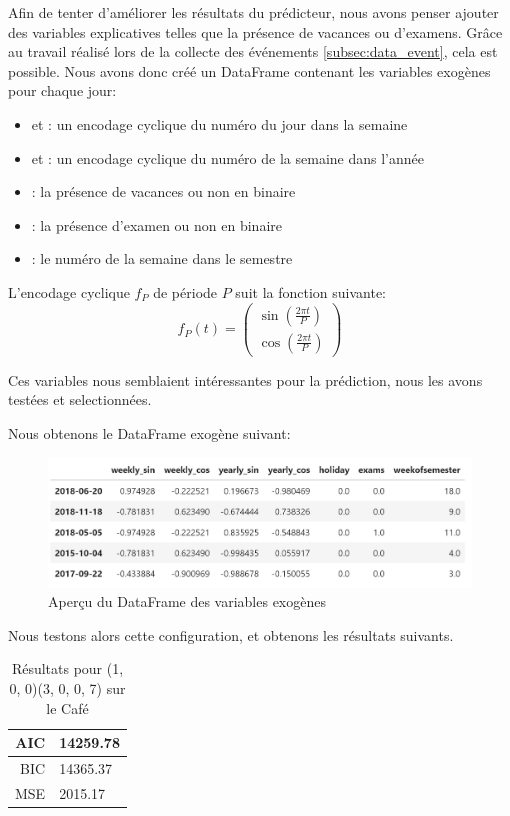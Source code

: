 Afin de tenter d'améliorer les résultats du prédicteur, nous avons penser ajouter des variables explicatives telles que la présence de vacances ou d'examens.  Grâce au travail réalisé lors de la collecte des événements \ref{subsec:data_event}, cela est possible. Nous avons donc créé un DataFrame contenant les variables exogènes pour chaque jour:
\begin{itemize}[nolistsep]
    \item {} et : un encodage cyclique du numéro du jour dans la semaine
    \item {} et : un encodage cyclique du numéro de la semaine dans l'année
    \item {}: la présence de vacances ou non en binaire
    \item {}: la présence d'examen ou non en binaire
    \item {}: le numéro de la semaine dans le semestre
\end{itemize}

L'encodage cyclique $f_P$ de période $P$ suit la fonction suivante:
\begin{equation}
    f_P(t) = \begin{pmatrix}
        \sin\left(\frac{2 \pi t}{P}\right) \\
        \cos\left(\frac{2 \pi t}{P}\right)
    \end{pmatrix}
    \label{eq:cycling_encoding}
\end{equation}

Ces variables nous semblaient intéressantes pour la prédiction, nous les avons testées et selectionnées.

Nous obtenons le DataFrame exogène suivant:
\begin{figure}[H]
    \centering
    \includegraphics[width=\textwidth]{figures/exog_df.png}
    \caption{Aperçu du DataFrame des variables exogènes}
    \label{fig:exog_df}
\end{figure}

Nous testons alors cette configuration, et obtenons les résultats suivants.
\begin{table}[ht]
    \centering
    \begin{tabular}{r|l}
        AIC & 14259.78 \\
        \hline
        BIC & 14365.37 \\
        \hline
        MSE &  2015.17 \\
    \end{tabular}
    \caption{Résultats pour \SARIMAX(1, 0, 0)(3, 0, 0, 7) sur le Café}
    \label{tab:pred_sarimax_cafe}
\end{table}


